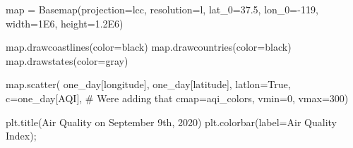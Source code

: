 \documentclass[
  letterpaper,
  DIV=11,
  numbers=noendperiod]{scrreprt}
\newenvironment{Shaded}{\begin{snugshade}}{\end{snugshade}}
\newcommand{\BuiltInTok}[1]{\textcolor[rgb]{0.00,0.23,0.31}{#1}}
\newcommand{\CommentTok}[1]{\textcolor[rgb]{0.37,0.37,0.37}{#1}}
\newcommand{\DecValTok}[1]{\textcolor[rgb]{0.68,0.00,0.00}{#1}}
\newcommand{\FloatTok}[1]{\textcolor[rgb]{0.68,0.00,0.00}{#1}}
\newcommand{\NormalTok}[1]{\textcolor[rgb]{0.00,0.23,0.31}{#1}}
\newcommand{\OperatorTok}[1]{\textcolor[rgb]{0.37,0.37,0.37}{#1}}
\newcommand{\StringTok}[1]{\textcolor[rgb]{0.13,0.47,0.30}{#1}}
\newcommand{\VariableTok}[1]{\textcolor[rgb]{0.07,0.07,0.07}{#1}}
\begin{document}
\begin{Shaded}
\begin{Highlighting}[]
\BuiltInTok{map} \OperatorTok{=}\NormalTok{ Basemap(projection}\OperatorTok{=}\StringTok{\textquotesingle{}lcc\textquotesingle{}}\NormalTok{, resolution}\OperatorTok{=}\StringTok{\textquotesingle{}l\textquotesingle{}}\NormalTok{, }
\NormalTok{            lat\_0}\OperatorTok{=}\FloatTok{37.5}\NormalTok{, lon\_0}\OperatorTok{={-}}\DecValTok{119}\NormalTok{,}
\NormalTok{            width}\OperatorTok{=}\FloatTok{1E6}\NormalTok{, height}\OperatorTok{=}\FloatTok{1.2E6}\NormalTok{)}

\BuiltInTok{map}\NormalTok{.drawcoastlines(color}\OperatorTok{=}\StringTok{\textquotesingle{}black\textquotesingle{}}\NormalTok{)}
\BuiltInTok{map}\NormalTok{.drawcountries(color}\OperatorTok{=}\StringTok{\textquotesingle{}black\textquotesingle{}}\NormalTok{)}
\BuiltInTok{map}\NormalTok{.drawstates(color}\OperatorTok{=}\StringTok{\textquotesingle{}gray\textquotesingle{}}\NormalTok{)}

\BuiltInTok{map}\NormalTok{.scatter(}
\NormalTok{      one\_day[}\StringTok{\textquotesingle{}longitude\textquotesingle{}}\NormalTok{], }
\NormalTok{      one\_day[}\StringTok{\textquotesingle{}latitude\textquotesingle{}}\NormalTok{], }
\NormalTok{      latlon}\OperatorTok{=}\VariableTok{True}\NormalTok{, }
\NormalTok{      c}\OperatorTok{=}\NormalTok{one\_day[}\StringTok{\textquotesingle{}AQI\textquotesingle{}}\NormalTok{], }\CommentTok{\# We\textquotesingle{}re adding that }
\NormalTok{      cmap}\OperatorTok{=}\NormalTok{aqi\_colors, }
\NormalTok{      vmin}\OperatorTok{=}\DecValTok{0}\NormalTok{, }
\NormalTok{      vmax}\OperatorTok{=}\DecValTok{300}\NormalTok{)}


\NormalTok{plt.title(}\StringTok{\textquotesingle{}Air Quality on September 9th, 2020\textquotesingle{}}\NormalTok{)}
\NormalTok{plt.colorbar(label}\OperatorTok{=}\StringTok{\textquotesingle{}Air Quality Index\textquotesingle{}}\NormalTok{)}\OperatorTok{;}
\end{Highlighting}
\end{Shaded}
\end{document}
